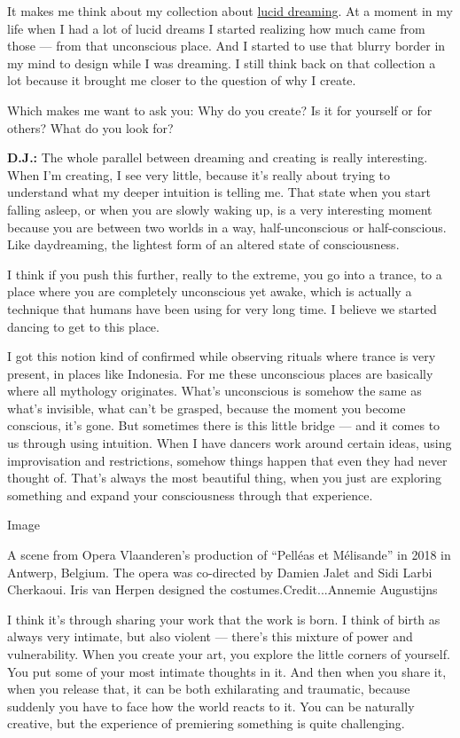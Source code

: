 It makes me think about my collection about
\href{https://www.irisvanherpen.com/haute-couture/lucid}{lucid
dreaming}. At a moment in my life when I had a lot of lucid dreams I
started realizing how much came from those --- from that unconscious
place. And I started to use that blurry border in my mind to design
while I was dreaming. I still think back on that collection a lot
because it brought me closer to the question of why I create.

Which makes me want to ask you: Why do you create? Is it for yourself or
for others? What do you look for?

\textbf{D.J.:} The whole parallel between dreaming and creating is
really interesting. When I'm creating, I see very little, because it's
really about trying to understand what my deeper intuition is telling
me. That state when you start falling asleep, or when you are slowly
waking up, is a very interesting moment because you are between two
worlds in a way, half-unconscious or half-conscious. Like daydreaming,
the lightest form of an altered state of consciousness.

I think if you push this further, really to the extreme, you go into a
trance, to a place where you are completely unconscious yet awake, which
is actually a technique that humans have been using for very long time.
I believe we started dancing to get to this place.

I got this notion kind of confirmed while observing rituals where trance
is very present, in places like Indonesia. For me these unconscious
places are basically where all mythology originates. What's unconscious
is somehow the same as what's invisible, what can't be grasped, because
the moment you become conscious, it's gone. But sometimes there is this
little bridge --- and it comes to us through using intuition. When I
have dancers work around certain ideas, using improvisation and
restrictions, somehow things happen that even they had never thought of.
That's always the most beautiful thing, when you just are exploring
something and expand your consciousness through that experience.

Image

A scene from Opera Vlaanderen's production of ``Pelléas et Mélisande''
in 2018 in Antwerp, Belgium. The opera was co-directed by Damien Jalet
and Sidi Larbi Cherkaoui. Iris van Herpen designed the
costumes.Credit...Annemie Augustijns

I think it's through sharing your work that the work is born. I think of
birth as always very intimate, but also violent --- there's this mixture
of power and vulnerability. When you create your art, you explore the
little corners of yourself. You put some of your most intimate thoughts
in it. And then when you share it, when you release that, it can be both
exhilarating and traumatic, because suddenly you have to face how the
world reacts to it. You can be naturally creative, but the experience of
premiering something is quite challenging.

